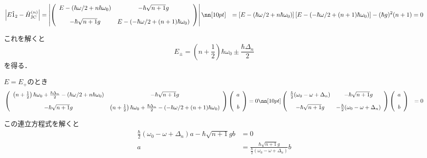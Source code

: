 \begin{align}
    \left|
    E\hat{1}_2-\hat{H}_{\rm{JC}}^{(n)}
    \right|
    &=\left|\left(
        \begin{array}{cc}
      E-(\hbar\omega/2+n\hbar\omega_0)& -\hbar\sqrt{n+1}g\\[10pt]
      -\hbar\sqrt{n+1}g& E-(-\hbar\omega/2+(n+1)\hbar\omega_0)\\
        \end{array}
        \right)\right|\nn[10pt]
    &=\left[
    E-(\hbar\omega/2+n\hbar\omega_0)
    \right]
    \left[
    E-(-\hbar\omega/2+(n+1)\hbar\omega_0)
    \right]
    -(\hbar g)^2(n+1)=0
\end{align}


これを解くと
\begin{equation}
    E_{\pm}=\left(
    n+\frac{1}{2}
    \right)\hbar\omega_0\pm\frac{\hbar\Delta_n}{2}
\end{equation}
を得る．

$E=E_+$のとき
\begin{align}
    \left(
        \begin{array}{cc}
      \left(n+\frac{1}{2}
    \right)\hbar\omega_0+\frac{\hbar\Delta_n}{2}-(\hbar\omega/2+n\hbar\omega_0)& -\hbar\sqrt{n+1}g\\[10pt]
      -\hbar\sqrt{n+1}g& \left(n+\frac{1}{2}
    \right)\hbar\omega_0+\frac{\hbar\Delta_n}{2}-(-\hbar\omega/2+(n+1)\hbar\omega_0)\\
        \end{array}
        \right)
        \left(
        \begin{array}{c}
      a\\[10pt]
      b\\
        \end{array}
        \right)&=0\nn[10pt]
        \left(
        \begin{array}{cc}
      \frac{\hbar}{2}(\omega_0-\omega+\Delta_n)& -\hbar\sqrt{n+1}g\\[10pt]
      -\hbar\sqrt{n+1}g& -\frac{\hbar}{2}(\omega_0-\omega+\Delta_n)\\
        \end{array}
        \right)
        \left(
        \begin{array}{c}
      a\\[10pt]
      b\\
        \end{array}
        \right)&=0
\end{align}

この連立方程式を解くと
\begin{align}
    \frac{\hbar}{2}(\omega_0-\omega+\Delta_n)a-\hbar\sqrt{n+1}gb&=0\\[10pt]
    a&=\frac{\hbar\sqrt{n+1}g}{\frac{\hbar}{2}(\omega_0-\omega+\Delta_n)}b
\end{align}

